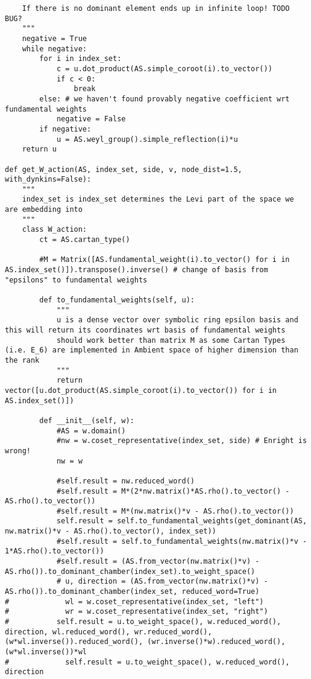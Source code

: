 \begin{verbatim}
    If there is no dominant element ends up in infinite loop! TODO BUG?
    """
    negative = True
    while negative:
        for i in index_set:
            c = u.dot_product(AS.simple_coroot(i).to_vector())
            if c < 0:
                break
        else: # we haven't found provably negative coefficient wrt fundamental weights
            negative = False
        if negative:
            u = AS.weyl_group().simple_reflection(i)*u
    return u

def get_W_action(AS, index_set, side, v, node_dist=1.5, with_dynkins=False):
    """
    index_set is index_set determines the Levi part of the space we are embedding into
    """
    class W_action:
        ct = AS.cartan_type()

        #M = Matrix([AS.fundamental_weight(i).to_vector() for i in AS.index_set()]).transpose().inverse() # change of basis from "epsilons" to fundamental weights

        def to_fundamental_weights(self, u):
            """
            u is a dense vector over symbolic ring epsilon basis and this will return its coordinates wrt basis of fundamental weights
            should work better than matrix M as some Cartan Types (i.e. E_6) are implemented in Ambient space of higher dimension than the rank
            """
            return vector([u.dot_product(AS.simple_coroot(i).to_vector()) for i in AS.index_set()])

        def __init__(self, w):
            #AS = w.domain()
            #nw = w.coset_representative(index_set, side) # Enright is wrong!
            nw = w

            #self.result = nw.reduced_word()
            #self.result = M*(2*nw.matrix()*AS.rho().to_vector() - AS.rho().to_vector())
            #self.result = M*(nw.matrix()*v - AS.rho().to_vector())
            self.result = self.to_fundamental_weights(get_dominant(AS, nw.matrix()*v - AS.rho().to_vector(), index_set))
            #self.result = self.to_fundamental_weights(nw.matrix()*v - 1*AS.rho().to_vector())
            #self.result = (AS.from_vector(nw.matrix()*v) - AS.rho()).to_dominant_chamber(index_set).to_weight_space()
            # u, direction = (AS.from_vector(nw.matrix()*v) - AS.rho()).to_dominant_chamber(index_set, reduced_word=True)
#             wl = w.coset_representative(index_set, "left")
#             wr = w.coset_representative(index_set, "right")
#           self.result = u.to_weight_space(), w.reduced_word(), direction, wl.reduced_word(), wr.reduced_word(), (w*wl.inverse()).reduced_word(), (wr.inverse()*w).reduced_word(), (w*wl.inverse())*wl
#             self.result = u.to_weight_space(), w.reduced_word(), direction


\end{verbatim}
